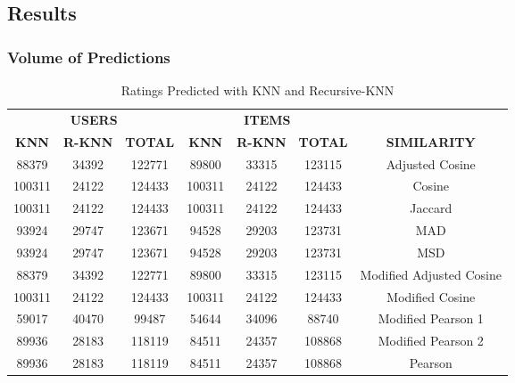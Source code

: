 \subsection{Results}
\begin{frame}
    \frametitle{Volume of Predictions}
    \vspace{-1.6cm}
    \begin{table}
\centering
\caption{Ratings Predicted with KNN and Recursive-KNN}
\footnotesize
\begin{tabular}{ccc|ccc|c}
\multicolumn{3}{c|}{\textbf{USERS}}            & \multicolumn{3}{c|}{\textbf{ITEMS}}            &                          \\ \cline{1-6}
\textbf{KNN} & \textbf{R-KNN} & \textbf{TOTAL} & \textbf{KNN} & \textbf{R-KNN} & \textbf{TOTAL} & \textbf{SIMILARITY}      \\ \hline
88379        & 34392          & 122771         & 89800        & 33315          & 123115         & Adjusted Cosine          \\
100311       & 24122          & 124433         & 100311       & 24122          & 124433         & Cosine                   \\
100311       & 24122          & 124433         & 100311       & 24122          & 124433         & Jaccard                  \\
93924        & 29747          & 123671         & 94528        & 29203          & 123731         & MAD                      \\
93924        & 29747          & 123671         & 94528        & 29203          & 123731         & MSD                      \\
88379        & 34392          & 122771         & 89800        & 33315          & 123115         & Modified Adjusted Cosine \\
100311       & 24122          & 124433         & 100311       & 24122          & 124433         & Modified Cosine          \\
59017        & 40470          & 99487          & 54644        & 34096          & 88740          & Modified Pearson 1       \\
89936        & 28183          & 118119         & 84511        & 24357          & 108868         & Modified Pearson 2       \\
89936        & 28183          & 118119         & 84511        & 24357          & 108868         & Pearson
\end{tabular}
\end{table}
\end{frame}
